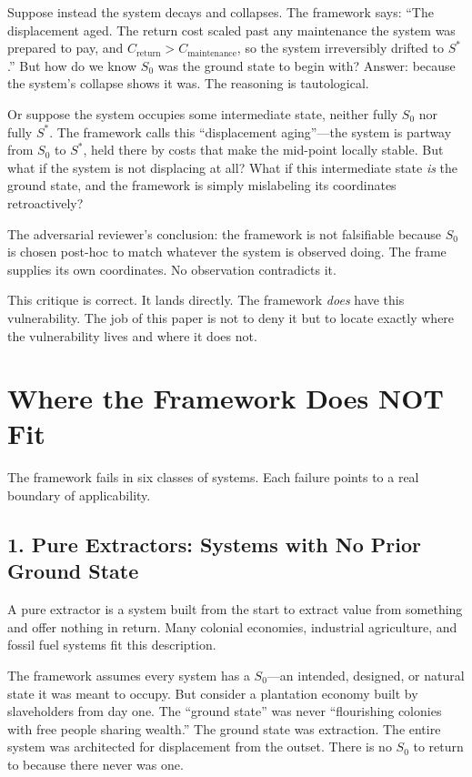 \documentclass[12pt]{article}
\begin{document}
Suppose instead the system decays and collapses. The framework says: ``The displacement aged. The return cost scaled past any maintenance the system was prepared to pay, and $C_{\text{return}} > C_{\text{maintenance}}$, so the system irreversibly drifted to $S^*$.'' But how do we know $S_0$ was the ground state to begin with? Answer: because the system's collapse shows it was. The reasoning is tautological.

Or suppose the system occupies some intermediate state, neither fully $S_0$ nor fully $S^*$. The framework calls this ``displacement aging''—the system is partway from $S_0$ to $S^*$, held there by costs that make the mid-point locally stable. But what if the system is not displacing at all? What if this intermediate state \textit{is} the ground state, and the framework is simply mislabeling its coordinates retroactively?

The adversarial reviewer's conclusion: the framework is not falsifiable because $S_0$ is chosen post-hoc to match whatever the system is observed doing. The frame supplies its own coordinates. No observation contradicts it.

This critique is correct. It lands directly. The framework \textit{does} have this vulnerability. The job of this paper is not to deny it but to locate exactly where the vulnerability lives and where it does not.

\section{Where the Framework Does NOT Fit}

The framework fails in six classes of systems. Each failure points to a real boundary of applicability.

\subsection{1. Pure Extractors: Systems with No Prior Ground State}

A pure extractor is a system built from the start to extract value from something and offer nothing in return. Many colonial economies, industrial agriculture, and fossil fuel systems fit this description.

The framework assumes every system has a $S_0$---an intended, designed, or natural state it was meant to occupy. But consider a plantation economy built by slaveholders from day one. The ``ground state'' was never ``flourishing colonies with free people sharing wealth.'' The ground state was extraction. The entire system was architected for displacement from the outset. There is no $S_0$ to return to because there never was one.
\end{document}
